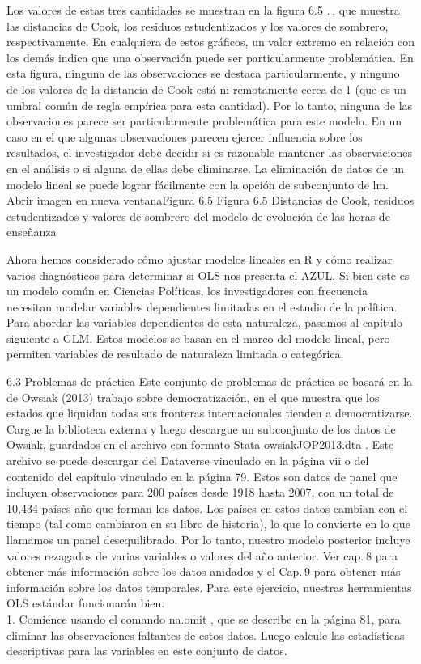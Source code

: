 \documentclass[
]{book}
\begin{document}
Los valores de estas tres cantidades se muestran en la figura 6.5 . , que muestra las distancias de Cook, los residuos estudentizados y los valores de sombrero, respectivamente. En cualquiera de estos gráficos, un valor extremo en relación con los demás indica que una observación puede ser particularmente problemática. En esta figura, ninguna de las observaciones se destaca particularmente, y ninguno de los valores de la distancia de Cook está ni remotamente cerca de 1 (que es un umbral común de regla empírica para esta cantidad). Por lo tanto, ninguna de las observaciones parece ser particularmente problemática para este modelo. En un caso en el que algunas observaciones parecen ejercer influencia sobre los resultados, el investigador debe decidir si es razonable mantener las observaciones en el análisis o si alguna de ellas debe eliminarse. La eliminación de datos de un modelo lineal se puede lograr fácilmente con la opción de subconjunto de lm.
Abrir imagen en nueva ventanaFigura 6.5
Figura 6.5
Distancias de Cook, residuos estudentizados y valores de sombrero del modelo de evolución de las horas de enseñanza

Ahora hemos considerado cómo ajustar modelos lineales en R y cómo realizar varios diagnósticos para determinar si OLS nos presenta el AZUL. Si bien este es un modelo común en Ciencias Políticas, los investigadores con frecuencia necesitan modelar variables dependientes limitadas en el estudio de la política. Para abordar las variables dependientes de esta naturaleza, pasamos al capítulo siguiente a GLM. Estos modelos se basan en el marco del modelo lineal, pero permiten variables de resultado de naturaleza limitada o categórica.

6.3 Problemas de práctica
Este conjunto de problemas de práctica se basará en la de Owsiak (2013) trabajo sobre democratización, en el que muestra que los estados que liquidan todas sus fronteras internacionales tienden a democratizarse. Cargue la biblioteca externa y luego descargue un subconjunto de los datos de Owsiak, guardados en el archivo con formato Stata owsiakJOP2013.dta . Este archivo se puede descargar del Dataverse vinculado en la página vii o del contenido del capítulo vinculado en la página 79. Estos son datos de panel que incluyen observaciones para 200 países desde 1918 hasta 2007, con un total de 10,434 países-año que forman los datos. Los países en estos datos cambian con el tiempo (tal como cambiaron en su libro de historia), lo que lo convierte en lo que llamamos un panel desequilibrado. Por lo tanto, nuestro modelo posterior incluye valores rezagados de varias variables o valores del año anterior. Ver cap. 8 para obtener más información sobre los datos anidados y el Cap. 9 para obtener más información sobre los datos temporales. Para este ejercicio, nuestras herramientas OLS estándar funcionarán bien.\\
1.
Comience usando el comando na.omit , que se describe en la página 81, para eliminar las observaciones faltantes de estos datos. Luego calcule las estadísticas descriptivas para las variables en este conjunto de datos.
\end{document}
